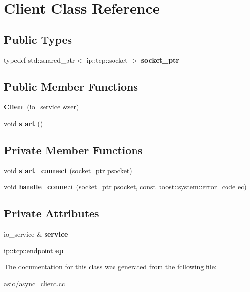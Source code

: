 \hypertarget{classClient}{}\section{Client Class Reference}
\label{classClient}
\subsection*{Public Types}
\begin{DoxyCompactItemize}
\item 
\mbox{\label{classClient_a03f58c98b8df3579787a6eccc298ab4a}} 
typedef std\+::shared\+\_\+ptr$<$ ip\+::tcp\+::socket $>$ {\bfseries socket\+\_\+ptr}
\end{DoxyCompactItemize}
\subsection*{Public Member Functions}
\begin{DoxyCompactItemize}
\item 
\mbox{\label{classClient_a2b0ae820b15a019267b423d0363ea101}} 
{\bfseries Client} (io\+\_\+service \&ser)
\item 
\mbox{\label{classClient_a742373e08a80d993d2651b6fff76f5b9}} 
void {\bfseries start} ()
\end{DoxyCompactItemize}
\subsection*{Private Member Functions}
\begin{DoxyCompactItemize}
\item 
\mbox{\label{classClient_a5011794316f35956bd84e936d6901a56}} 
void {\bfseries start\+\_\+connect} (socket\+\_\+ptr psocket)
\item 
\mbox{\label{classClient_a597b228a77ab86e302ec96334c797843}} 
void {\bfseries handle\+\_\+connect} (socket\+\_\+ptr psocket, const boost\+::system\+::error\+\_\+code ec)
\end{DoxyCompactItemize}
\subsection*{Private Attributes}
\begin{DoxyCompactItemize}
\item 
\mbox{\label{classClient_ac0a4b8c27ad244474468d01ac3196251}} 
io\+\_\+service \& {\bfseries service}
\item 
\mbox{\label{classClient_ac9ba36c4dc3810ff4cab07a250b9b78d}} 
ip\+::tcp\+::endpoint {\bfseries ep}
\end{DoxyCompactItemize}


The documentation for this class was generated from the following file\+:\begin{DoxyCompactItemize}
\item 
asio/async\+\_\+client.\+cc\end{DoxyCompactItemize}
